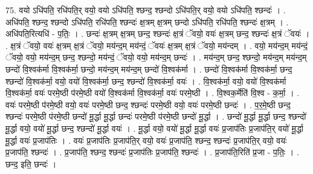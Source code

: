 \documentclass[17pt]{extarticle}
\begin{document}
75. वयो ऽधि॑पति॒ रधि॑पति॒र् वयो॒ वयो ऽधि॑पति॒ श्छन्द॒ श्छन्दो ऽधि॑पति॒र् वयो॒ वयो ऽधि॑पति॒ श्छन्दः॑ । . अधि॑पति॒ श्छन्द॒ श्छन्दो ऽधि॑पति॒ रधि॑पति॒ श्छन्दः॑ क्ष॒त्रम् क्ष॒त्रम् छन्दो ऽधि॑पति॒ रधि॑पति॒ श्छन्दः॑ क्ष॒त्रम् । . अधि॑पति॒रित्यधि॑ - प॒तिः॒ । . छन्दः॑ क्ष॒त्रम् क्ष॒त्रम् छन्द॒ श्छन्दः॑ क्ष॒त्रं ॅवयो॒ वयः॑ क्ष॒त्रम् छन्द॒ श्छन्दः॑ क्ष॒त्रं ॅवयः॑ । . क्ष॒त्रं ॅवयो॒ वयः॑ क्ष॒त्रम् क्ष॒त्रं ॅवयो॒ मय॑न्द॒म् मय॑न्दं॒ ॅवयः॑ क्ष॒त्रम् क्ष॒त्रं ॅवयो॒ मय॑न्दम् । . वयो॒ मय॑न्द॒म् मय॑न्दं॒ ॅवयो॒ वयो॒ मय॑न्द॒म् छन्द॒ श्छन्दो॒ मय॑न्दं॒ ॅवयो॒ वयो॒ मय॑न्द॒म् छन्दः॑ । . मय॑न्द॒म् छन्द॒ श्छन्दो॒ मय॑न्द॒म् मय॑न्द॒म् छन्दो॑ वि॒श्वक॑र्मा वि॒श्वक॑र्मा॒ छन्दो॒ मय॑न्द॒म् मय॑न्द॒म् छन्दो॑ वि॒श्वक॑र्मा । . छन्दो॑ वि॒श्वक॑र्मा वि॒श्वक॑र्मा॒ छन्द॒ श्छन्दो॑ वि॒श्वक॑र्मा॒ वयो॒ वयो॑ वि॒श्वक॑र्मा॒ छन्द॒ श्छन्दो॑ वि॒श्वक॑र्मा॒ वयः॑ । . वि॒श्वक॑र्मा॒ वयो॒ वयो॑ वि॒श्वक॑र्मा वि॒श्वक॑र्मा॒ वयः॑ परमे॒ष्ठी प॑रमे॒ष्ठी वयो॑ वि॒श्वक॑र्मा वि॒श्वक॑र्मा॒ वयः॑ परमे॒ष्ठी । . वि॒श्वक॒र्मेति॑ वि॒श्व - क॒र्मा॒ । . वयः॑ परमे॒ष्ठी प॑रमे॒ष्ठी वयो॒ वयः॑ परमे॒ष्ठी छन्द॒ श्छन्दः॑ परमे॒ष्ठी वयो॒ वयः॑ परमे॒ष्ठी छन्दः॑ । . प॒र॒मे॒ष्ठी छन्द॒ श्छन्दः॑ परमे॒ष्ठी प॑रमे॒ष्ठी छन्दो॑ मू॒र्द्धा मू॒र्द्धा छन्दः॑ परमे॒ष्ठी प॑रमे॒ष्ठी छन्दो॑ मू॒र्द्धा । . छन्दो॑ मू॒र्द्धा मू॒र्द्धा छन्द॒ श्छन्दो॑ मू॒र्द्धा वयो॒ वयो॑ मू॒र्द्धा छन्द॒ श्छन्दो॑ मू॒र्द्धा वयः॑ । . मू॒र्द्धा वयो॒ वयो॑ मू॒र्द्धा मू॒र्द्धा वयः॑ प्र॒जाप॑तिः प्र॒जाप॑ति॒र् वयो॑ मू॒र्द्धा मू॒र्द्धा वयः॑ प्र॒जाप॑तिः । . वयः॑ प्र॒जाप॑तिः प्र॒जाप॑ति॒र् वयो॒ वयः॑ प्र॒जाप॑ति॒ श्छन्द॒ श्छन्दः॑ प्र॒जाप॑ति॒र् वयो॒ वयः॑ प्र॒जाप॑ति॒ श्छन्दः॑ । . प्र॒जाप॑ति॒ श्छन्द॒ श्छन्दः॑ प्र॒जाप॑तिः प्र॒जाप॑ति॒ श्छन्दः॑ । . प्र॒जाप॑ति॒रिति॑ प्र॒जा - प॒तिः॒ । . छन्द॒ इति॒ छन्दः॑ । \newline
\pagebreak
{}
\end{document}
